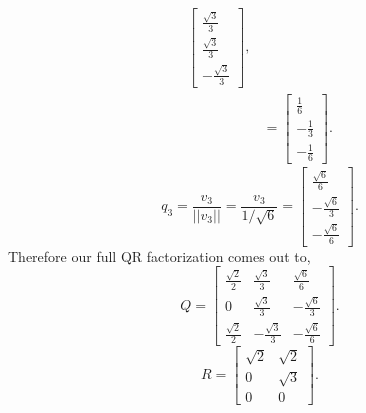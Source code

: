 \documentclass[12pt]{article}
\makeatletter
\theoremstyle{homework}
\newenvironment{exercise}[1]
{\def\@currentlabel{#1}\exercisecore}
{\endexercisecore}
\makeatother
\begin{document}
\begin{exercise}{7.1}
\begin{enumerate}
\begin{align*}
\begin{bmatrix}
        \frac{\sqrt{3}}{3}\\
        \frac{\sqrt{3}}{3}\\
        -\frac{\sqrt{3}}{3}
      \end{bmatrix},\\
      & = \begin{bmatrix}\frac{1}{6}\\ -\frac{1}{3}\\ -\frac{1}{6}\end{bmatrix}.
    \end{align*}
    \begin{equation*}
      q_3 = \frac{v_3}{||v_3||} = \frac{v_3}{1/\sqrt{6}} = \begin{bmatrix}\frac{\sqrt{6}}{6}\\ -\frac{\sqrt{6}}{3}\\ -\frac{\sqrt{6}}{6}\end{bmatrix}.
    \end{equation*}
    Therefore our full QR factorization comes out to, 
    \begin{equation*}
      Q = \begin{bmatrix}
        \frac{\sqrt{2}}{2} & \frac{\sqrt{3}}{3} &\frac{\sqrt{6}}{6} \\
        0 & \frac{\sqrt{3}}{3}& -\frac{\sqrt{6}}{3}\\
        \frac{\sqrt{2}}{2} & -\frac{\sqrt{3}}{3} & -\frac{\sqrt{6}}{6}
      \end{bmatrix}.
    \end{equation*}
    \begin{equation*}
      R = 
      \begin{bmatrix}
        \sqrt{2} & \sqrt{2}\\
        0 & \sqrt{3}\\
        0 & 0
      \end{bmatrix}.
    \end{equation*}
  \end{enumerate}
\end{exercise}
\vspace{1in}
\end{document}
